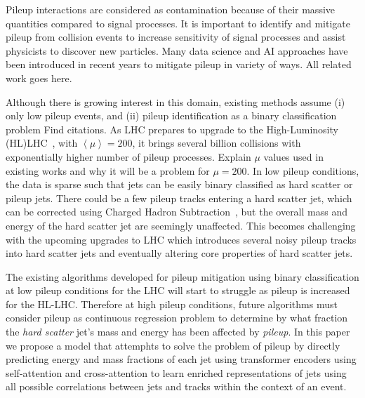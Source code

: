Pileup interactions are considered as contamination because of their massive quantities compared to signal processes. It is important to identify and mitigate pileup from collision events to increase sensitivity of signal processes and assist physicists to discover new particles. Many data science and AI approaches have been introduced in recent years to mitigate pileup in variety of ways. All related work goes here.

Although there is growing interest in this domain, existing methods  assume (i) only low pileup events, and (ii) pileup identification as a binary classification problem Find citations. As LHC prepares to upgrade to the High-Luminosity (HL)LHC~\cite{HLLHC}, with $\left\langle \mu \right\rangle = 200$, it brings several billion collisions with exponentially higher number of pileup processes. Explain $\mu$ values used in existing works and why it will be a problem for $\mu = 200$. In low pileup conditions, the data is sparse such that jets can be easily binary classified as hard scatter or pileup jets. There could be a few pileup tracks entering a hard scatter jet, which can be corrected using Charged Hadron Subtraction~\cite{CHS}, but the overall mass and energy of the hard scatter jet are seemingly unaffected. This becomes challenging with the upcoming upgrades to LHC which introduces several noisy pileup tracks into hard scatter jets and eventually altering core properties of hard scatter jets.


The existing algorithms developed for pileup mitigation using binary classification at low pileup conditions for the LHC will start to struggle as pileup is increased for the HL-LHC. Therefore at high pileup conditions, future algorithms must consider pileup as continuous regression problem to determine by what fraction the \emph{hard scatter} jet's mass and energy has been affected by \emph{pileup}. In this paper we propose a model that attemphts to solve the problem of pileup by directly predicting energy and mass fractions of each jet using transformer encoders using self-attention and cross-attention to learn enriched representations of jets using all possible correlations between jets and tracks within the context of an event.

